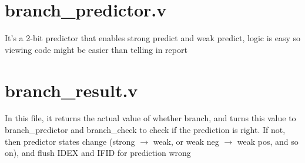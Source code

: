 \documentclass[12pt]{article}
\begin{document}
\section* {branch\_predictor.v}
It's a 2-bit predictor that enables strong predict and weak predict, logic is easy so viewing code might be easier than telling in report

\section* {branch\_result.v}
In this file, it returns the actual value of whether branch, and turns this value to branch\_predictor and branch\_check to check if the prediction is right. If not, then predictor states change (strong $\rightarrow$ weak, or weak neg $\rightarrow$ weak pos, and so on), and flush IDEX and IFID for prediction wrong
\end{document}
